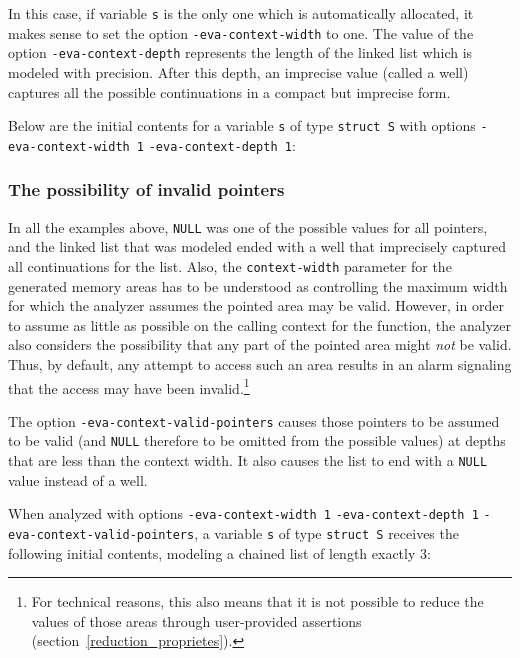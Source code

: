 \documentclass{frama-c-book}
\begin{document}
In this case, if variable \lstinline|s| is the only one which
is automatically allocated, it makes sense to set the option
\lstinline|-eva-context-width| to one.  The value of the
option \lstinline|-eva-context-depth| represents the length of the
linked list which is modeled with precision. After this depth,
an imprecise value (called a well) captures all the possible continuations
in a compact but imprecise form.

Below are the initial contents for a variable \lstinline|s| of type \lstinline|struct S|
with options \lstinline|-eva-context-width 1|
\lstinline|-eva-context-depth 1|:


\subsubsection{The possibility of invalid pointers}

In all the examples above, \lstinline|NULL| was one of the
possible values for all pointers, and the linked list that was
modeled ended with a well that imprecisely captured all continuations
for the list. Also, the \lstinline|context-width| parameter
for the generated memory areas has to be understood as controlling the maximum
width for which the analyzer assumes the pointed area may be valid.
However, in order to assume as little as possible on the calling context
for the function, the analyzer also
considers the possibility that any part of the pointed area might \emph{not} be
valid. Thus, by default, any attempt to access such an area results in an alarm
signaling that the access may have been invalid.\footnote{For technical
reasons, this also means that it is not possible to reduce the values
of those areas through user-provided assertions
(section~\ref{reduction_proprietes}).
}

The option \lstinline|-eva-context-valid-pointers| causes
those pointers to be assumed to be valid (and
\lstinline|NULL| therefore to be omitted from the possible values)
at depths that are less than the context width.
It also causes the list to end with a
\lstinline|NULL| value instead of a well.

When analyzed with options
\lstinline|-eva-context-width 1| \lstinline|-eva-context-depth 1|
\lstinline|-eva-context-valid-pointers|,
a variable \lstinline|s| of
type \lstinline|struct S| receives  the following initial contents,
modeling a chained list of length exactly 3:
\end{document}
